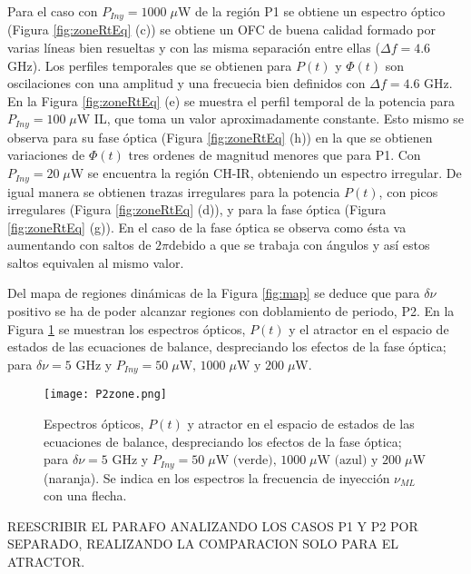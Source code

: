 			Para el caso con $P_{Iny} = 1000\;\mu$W de la región P1 se obtiene un espectro óptico (Figura \ref{fig:zoneRtEq} (c)) se obtiene un OFC de buena calidad formado por varias líneas bien resueltas y con las misma separación entre ellas ($\Delta f = 4.6$ GHz). Los perfiles temporales que se obtienen para $P(t)$ y $\Phi(t)$ son oscilaciones con una amplitud y una frecuecia bien definidos con $\Delta f = 4.6$ GHz. En la Figura \ref{fig:zoneRtEq} (e)  se muestra el perfil temporal de la potencia para $P_{Iny} = 100\;\mu$W IL, que toma un valor aproximadamente constante. Esto mismo se observa para su fase óptica (Figura \ref{fig:zoneRtEq} (h)) en la que se obtienen variaciones de $\Phi(t)$ tres ordenes de magnitud menores que para P1. Con $P_{Iny} = 20\;\mu$W se encuentra la región CH-IR, obteniendo un espectro irregular. De igual manera se obtienen trazas irregulares para la potencia $P(t)$, con picos irregulares (Figura \ref{fig:zoneRtEq} (d)), y para la fase \'optica (Figura \ref{fig:zoneRtEq} (g)). En el caso de la fase \'optica se observa como \'esta va aumentando con saltos de $2 \pi$debido a que se trabaja con \'angulos y as\'i estos saltos equivalen al mismo valor. 

		Del mapa de regiones dinámicas de la Figura \ref{fig:map} se deduce que para $\delta\nu$ positivo se ha de poder alcanzar regiones con doblamiento de periodo, P2. En la Figura \ref{fig:P2zone} se muestran los espectros ópticos, $P(t)$ y el atractor en el espacio de estados de las ecuaciones de balance, despreciando los efectos de la fase óptica; para $\delta\nu = 5$ GHz y $P_{Iny} = 50\;\mu \textrm{W, } 1000\;\mu\textrm{W y } 200\;\mu$W.

			\begin{figure}[H]
				\centering
				\texttt{[image: P2zone.png]}
				\caption{\label{fig:P2zone}Espectros ópticos, $P(t)$ y atractor en el espacio de estados de las ecuaciones de balance, despreciando los efectos de la fase óptica; para $\delta\nu = 5$ GHz y $P_{Iny} = 50\;\mu \textrm{W (verde), } 1000\;\mu\textrm{W (azul) y } 200\;\mu$W (naranja). Se indica en los espectros la frecuencia de inyección $\nu_{ML}$ con una flecha.}	
			\end{figure}

		REESCRIBIR EL PARAFO ANALIZANDO LOS CASOS P1 Y P2 POR SEPARADO, REALIZANDO LA COMPARACION SOLO PARA EL ATRACTOR.


